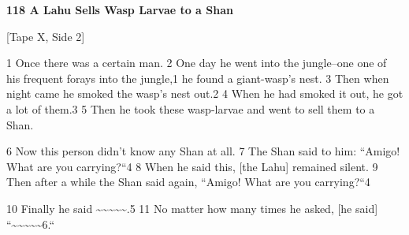
\textbf{118 A Lahu Sells Wasp Larvae to a Shan }

[Tape X, Side 2]

1 Once there was a certain man. 2 One day he went into the jungle--one one of his
frequent forays into the jungle,1 he found a giant-wasp's nest. 3 Then when night
came he smoked the wasp's nest out.2 4 When he had smoked it out, he got a lot
of them.3 5 Then he took these wasp-larvae and went to sell them to a Shan.

6 Now this person didn't know any Shan at all. 7 The Shan said to him: ``Amigo!
What are you carrying?``4 8 When he said this, [the Lahu] remained silent.
9 Then after a while the Shan said again, ``Amigo! What are you carrying?``4

10 Finally he said \textasciitilde{}\textasciitilde{}\textasciitilde{}\textasciitilde{}\textasciitilde{}.5
11 No matter how many times he asked, [he said] ``\textasciitilde{}\textasciitilde{}\textasciitilde{}\textasciitilde{}\textasciitilde{}6.``

